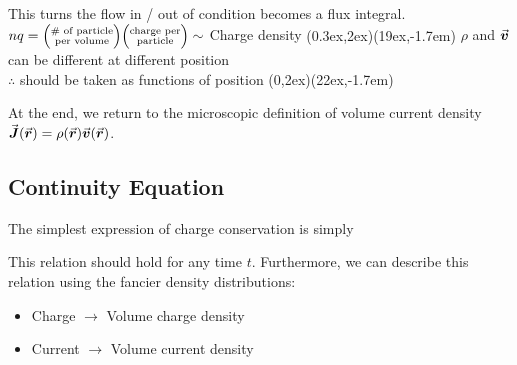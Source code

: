 \documentclass[class=article, crop=false, 12pt]{standalone}
\begin{document}
\begin{enumerate}

    This turns the flow in / out of condition becomes a flux integral.
    {\scriptsize $nq =\qty(\substack{\text{\# of particle}\\\text{per volume}})\qty(\substack{\text{charge per}\\\text{particle}})\sim $ Charge density}
    {(0.3ex,2ex)}{(19ex,-1.7em)}
    {\scriptsize $\rho$ and $\va*{v}$ can be different at different position\\[-1ex]\scriptsize $\therefore$ should be taken as functions of position}
    {(0,2ex)}{(22ex,-1.7em)}

    At the end, 
    we return to the microscopic definition of volume current density 
    $\va*{J}(\va*{r}) = \rho(\va*{r})\va*{v}(\va*{r})$. 
\end{enumerate}



\subsection{Continuity Equation}

The simplest expression of charge conservation is simply

This relation should hold for any time $t$. 
Furthermore, we can describe this relation using the fancier density distributions:
\begin{itemize}
    \item Charge $\rightarrow$ Volume charge density
    \item Current $\rightarrow$ Volume current density
\end{itemize}
\end{document}
